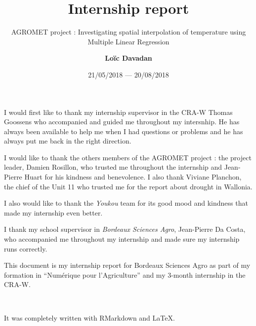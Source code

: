 \documentclass[12pt,twoside]{reedthesis}
\title{Internship report}
\author{\textbf{Loïc Davadan}}
\date{21/05/2018 --- 20/08/2018}
\subtitle{AGROMET project : Investigating spatial interpolation of temperature
using Multiple Linear Regression}
\theoremstyle{definition}
\theoremstyle{definition}
\theoremstyle{definition}
\theoremstyle{remark}
\begin{document}
  \maketitle

\frontmatter %
\pagestyle{empty} %
  \begin{acknowledgements}
    I would first like to thank my internship supervisor in the CRA-W Thomas
    Goossens who accompanied and guided me throughout my intersnhip. He has
    always been available to help me when I had questions or problems and he
    has always put me back in the right direction.
    
    I would like to thank the others members of the AGROMET project : the
    project leader, Damien Rosillon, who trusted me throughout the
    internship and Jean-Pierre Huart for his kindness and benevolence. I
    also thank Viviane Planchon, the chief of the Unit 11 who trusted me for
    the report about drought in Wallonia.
    
    I also would like to thank the \emph{Youkou} team for its good mood and
    kindness that made my internship even better.
    
    I thank my school supervisor in \emph{Bordeaux Sciences Agro},
    Jean-Pierre Da Costa, who accompanied me throughout my internship and
    made sure my internship runs correctly.
  \end{acknowledgements}
  \begin{preface}
    This document is my internship report for Bordeaux Sciences Agro as part
    of my formation in ``Numérique pour l'Agriculture'' and my 3-month
    internship in the CRA-W.
    
    ~
    
    It was completely written with RMarkdown and \LaTeX.
  \end{preface}
\end{document}
